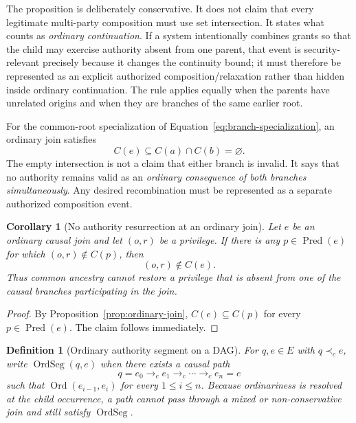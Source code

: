 \documentclass[10pt,twocolumn]{article}
\newcommand{\hb}{\prec_{c}}
\newcommand{\Ord}{\operatorname{Ord}}
\newcommand{\OrdSeg}{\operatorname{OrdSeg}}
\newcommand{\Pred}{\operatorname{Pred}}
\newtheorem{definition}{Definition}
\newtheorem{corollary}{Corollary}
\begin{document}
The proposition is deliberately conservative.  It does not claim that every
legitimate multi-party composition must use set intersection.  It states what
counts as \emph{ordinary continuation}.  If a system intentionally combines
grants so that the child may exercise authority absent from one parent, that
event is security-relevant precisely because it changes the continuity bound;
it must therefore be represented as an explicit authorized
composition/relaxation rather than hidden inside ordinary continuation.  The
rule applies equally when the parents have unrelated origins and when they are
branches of the same earlier root.

For the common-root specialization of
Equation~\eqref{eq:branch-specialization}, an ordinary join satisfies
\begin{equation}
  C(e)\subseteq C(a)\cap C(b)=\varnothing.
  \label{eq:common-root-empty-join}
\end{equation}
The empty intersection is not a claim that either branch is invalid.  It says
that no authority remains valid as an \emph{ordinary consequence of both
branches simultaneously}.  Any desired recombination must be represented as a
separate authorized composition event.

\begin{corollary}[No authority resurrection at an ordinary join]
\label{cor:no-resurrection}
Let $e$ be an ordinary causal join and let $(o,r)$ be a privilege.  If there is
any $p\in\Pred(e)$ for which $(o,r)\notin C(p)$, then
\begin{equation}
  (o,r)\notin C(e).
\end{equation}
Thus common ancestry cannot restore a privilege that is absent from one of the
causal branches participating in the join.
\end{corollary}

\begin{proof}
By Proposition~\ref{prop:ordinary-join}, $C(e)\subseteq C(p)$ for every
$p\in\Pred(e)$.  The claim follows immediately.
\end{proof}

\begin{definition}[Ordinary authority segment on a DAG]
\label{def:ordinary-segment}
For $q,e\in E$ with $q\hb e$, write $\OrdSeg(q,e)$ when there exists a causal
path
\begin{equation}
  q=e_0\to_c e_1\to_c\cdots\to_c e_n=e
\end{equation}
such that $\Ord(e_{i-1},e_i)$ for every $1\le i\le n$.  Because ordinariness is
resolved at the child occurrence, a path cannot pass through a mixed or
non-conservative join and still satisfy $\OrdSeg$.
\end{definition}
\end{document}

